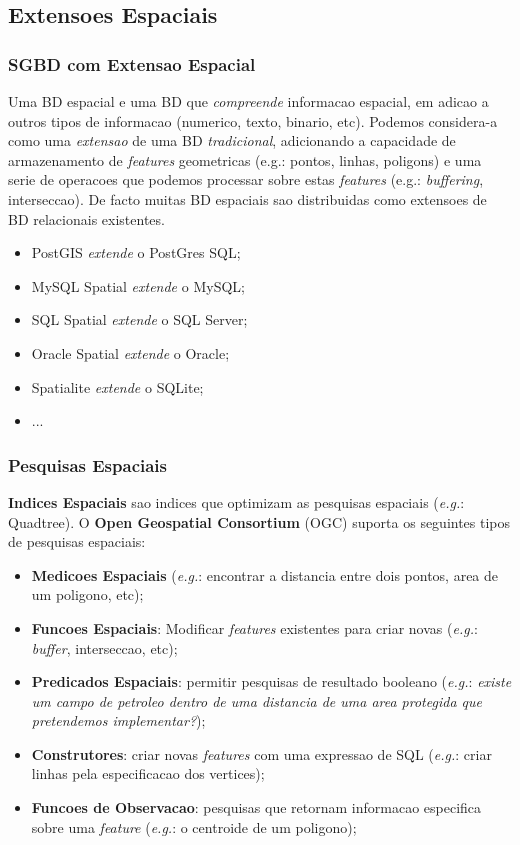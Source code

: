 \documentclass[hyperref={pdfpagelabels=true}]{beamer}
\begin{document}
\subsection{Extensoes Espaciais}
\begin{frame}
\frametitle{SGBD com Extensao Espacial}
Uma BD espacial e uma BD que \textit{compreende} informacao espacial, em adicao a outros tipos de informacao (numerico, texto, binario, etc).
Podemos considera-a como uma \textit{extensao} de uma BD \textit{tradicional}, adicionando a capacidade de armazenamento de
\textit{features} geometricas (e.g.: pontos, linhas, poligons) e uma serie de operacoes que podemos processar sobre estas \textit{features} 
(e.g.: \textit{buffering}, interseccao). De facto muitas BD espaciais sao distribuidas como extensoes de BD relacionais existentes.
    \begin{itemize}
      \item<2-> PostGIS \textit{extende} o PostGres SQL;
      \item<2-> MySQL Spatial \textit{extende} o MySQL;
      \item<2-> SQL Spatial \textit{extende} o SQL Server;
      \item<2-> Oracle Spatial \textit{extende} o Oracle;
      \item<2-> Spatialite \textit{extende} o SQLite;
      \item<2-> ... 
      \end{itemize}  
\end{frame}

\begin{frame}
\frametitle{Pesquisas Espaciais}
\textbf{Indices Espaciais} sao indices que optimizam as pesquisas espaciais (\textit{e.g.}: Quadtree).
O \textbf{Open Geospatial Consortium} (OGC) suporta os seguintes tipos de pesquisas espaciais:
    \begin{itemize}
      \item<2-> \textbf{Medicoes Espaciais} (\textit{e.g.}: encontrar a distancia entre dois pontos, area de um poligono, etc);
      \item<3-> \textbf{Funcoes Espaciais}: Modificar \textit{features} existentes para criar novas (\textit{e.g.}: \textit{buffer}, interseccao, etc);
      \item<4-> \textbf{Predicados Espaciais}: permitir pesquisas de resultado booleano (\textit{e.g.}: \textit{existe um campo de petroleo dentro de uma distancia de uma area protegida que pretendemos implementar?});
      \item<5-> \textbf{Construtores}: criar novas \textit{features} com uma expressao de SQL (\textit{e.g.}: criar linhas pela especificacao dos vertices);
      \item<6-> \textbf{Funcoes de Observacao}: pesquisas que retornam informacao especifica sobre uma \textit{feature} (\textit{e.g.}: o centroide de um poligono);
    \end{itemize}  
\end{frame}
\end{document}
